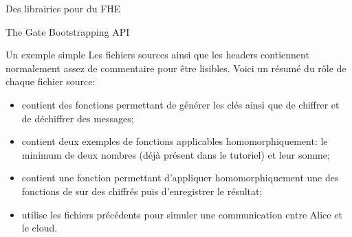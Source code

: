 \begin{section}{Des librairies pour du FHE}
\begin{subsection}{The Gate Bootstrapping API}
\begin{subsubsection}{Un exemple simple}
Les fichiers sources ainsi que les headers contiennent normalement assez de
commentaire pour être lisibles. Voici un résumé du rôle de chaque fichier source:
\begin{itemize}
\item {} contient des fonctions permettant de générer les
clés ainsi que de chiffrer et de déchiffrer des messages;
\item {} contient deux exemples de fonctions 
applicables homomorphiquement: le minimum de deux nombres (déjà 
présent dans le tutoriel) et leur somme;
\item {} contient une fonction permettant d'appliquer 
homomorphiquement une des fonctions de 
sur des chiffrés puis d'enregistrer le résultat;
\item {} utilise les fichiers précédents
	pour simuler une communication entre Alice et le cloud.
\end{itemize}


	
\end{subsubsection} %
\end{subsection} %
\end{section}
